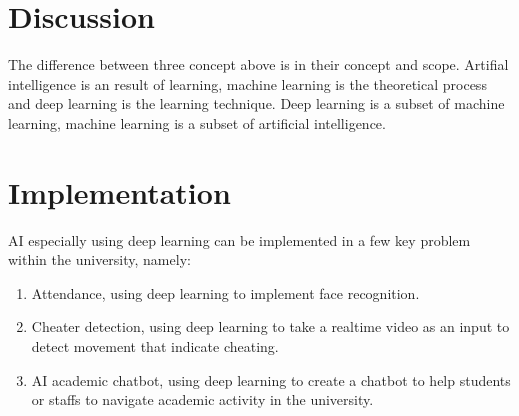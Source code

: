 \documentclass[a4paper,10pt]{article}
\begin{document}
\section{Discussion}

The difference between three concept above is in their concept and scope.
Artifial intelligence is an result of learning, machine learning is the theoretical process and deep learning is the learning technique.
Deep learning is a subset of machine learning, machine learning is a subset of artificial intelligence.

\section{Implementation}

AI especially using deep learning can be implemented in a few key problem within the university, namely:
\begin{enumerate}
    \item Attendance, using deep learning to implement face recognition.
    \item Cheater detection, using deep learning to take a realtime video as an input to detect movement that indicate cheating.
    \item AI academic chatbot, using deep learning to create a chatbot to help students or staffs to navigate academic activity in the university.
\end{enumerate}

\printbibliography{}
\end{document}

